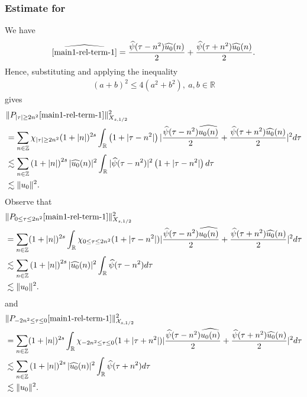\documentclass[12pt,reqno]{amsart}
\numberwithin{equation}{section}  %
\renewcommand{\cref}{\Cref}
\newcommand{\rr}{\mathbb{R}}
\newcommand{\zz}{\mathbb{Z}}
\newcommand{\wh}{\widehat}
\begin{document}
\subsubsection{Estimate for \cref{main1-rel-term-1}}
\label{ssec:est-init-term-1}
We have
%
%
\begin{equation*}
  \begin{split}
    \wh{\cref{main1-rel-term-1}}
    = \frac{\wh{\psi}(\tau -
    n^{2})\wh{u_{0}}(n)}{2} + \frac{\wh{\psi}(\tau +
    n^{2})\wh{u_{0}}(n)}{2}.
  \end{split}
\end{equation*}
%
%
Hence, substituting and applying the inequality 
%
%
\begin{equation}
  \label{square-ineq}
\begin{split}
(a + b)^{2} \le 4(a^{2} +
b^{2}),\ a, b \in \rr
\end{split}
\end{equation}
%
%
gives
%
%
\begin{align*}
  & \| P_{| \tau | \ge 2n^{2}}\cref{main1-rel-term-1} \|_{X_{s,1/2}}^{2} 
    \notag
    \\
    & = \sum_{n \in \zz} \chi_{| \tau | \ge 2n^{2}}(1 + |n|)^{2s} \int_{\rr}\left( 1 + | \tau
    -n^{2} | \right) | \frac{\wh{\psi}(\tau - n^{2})\wh{u_{0}(n)}}{2} +
    \frac{\wh{\psi}(\tau + n^{2})\wh{u_{0}}(n)}{2} |^{2} d \tau
    \notag
    \\
    & \lesssim \sum_{n \in \zz} \left( 1 + |n| \right)^{2s} | \wh{u_{0}}(n)
    |^{2} \int_{\rr} | \wh{\psi}(\tau - n^{2}) |^{2}\left( 1 + |  \tau  -
    n^{2} | \right) d \tau
    \\
    & \lesssim \| u_{0} \|^{2}.
\end{align*}
%
%
%
%
%
%
%
%
%
%
%
Observe that
\begin{align*}
  & \| P_{0 \le \tau \le 2n^{2}}\cref{main1-rel-term-1} \|_{X_{s,1/2}}^{2} 
    \notag
    \\
    & = \sum_{n \in \zz} (1 + |n|)^{2s} \int_{\rr} \chi_{0 \le \tau \le 2n^{2}}(1 + | \tau - n^{2} |)| \frac{\wh{\psi}(\tau - n^{2})\wh{u_{0}(n)}}{2} +
    \frac{\wh{\psi}(\tau + n^{2})\wh{u_{0}}(n)}{2} |^{2} d \tau
    \notag
    \\
    & \lesssim \sum_{n \in \zz} \left( 1 + |n| \right)^{2s} | \wh{u_{0}}(n)
    |^{2} \int_{\rr} \wh{\psi}(\tau - n^{2})d \tau
    \\
    & \lesssim \| u_{0} \|^{2}.
\end{align*}
%
and
\begin{align*}
  & \| P_{-2n^{2} \le \tau \le 0}\cref{main1-rel-term-1} \|_{\mathcal{X}_{s,1/2}}^{2} 
    \notag
    \\
    & = \sum_{n \in \zz} (1 + |n|)^{2s} \int_{\rr} \chi_{-2n^{2} \le \tau \le 0}(1 + | \tau + n^{2} |)| \frac{\wh{\psi}(\tau - n^{2})\wh{u_{0}(n)}}{2} +
    \frac{\wh{\psi}(\tau + n^{2})\wh{u_{0}}(n)}{2} |^{2} d \tau
    \notag
    \\
    & \lesssim \sum_{n \in \zz} \left( 1 + |n| \right)^{2s} | \wh{u_{0}}(n)
    |^{2} \int_{\rr} \wh{\psi}(\tau + n^{2})d \tau
    \\
    & \lesssim \| u_{0} \|^{2}.
\end{align*}
\end{document}
